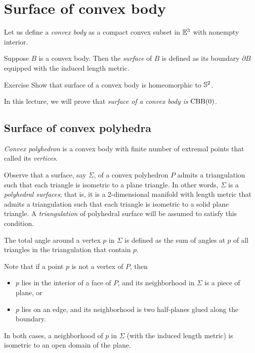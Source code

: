 \chapter{Surface of convex body}\label{chap:convex-body}

Let us define a \emph{convex body} as a compact convex subset in $\mathbb{E}^3$ with nonempty interior.

Suppose $B$ is a convex body.
Then the \emph{surface} of $B$ is defined as its boundary $\partial B$ equipped with the induced length metric.

\begin{thm}{Exercise}\label{ex:surf-S2}
Show that surface of a convex body is homeomorphic to $\mathbb{S}^2$.
\end{thm}

In this lecture, we will prove that \textit{surface of a convex body is $\mathrm{CBB}(0)$.}


\section{Surface of convex polyhedra}

\emph{Convex polyhedron} is a convex body with finite number of extremal points that called its \emph{vertices}.

Observe that a surface, say $\Sigma$, of a convex polyhedron $P$ admits a triangulation such that each triangle is isometric to a plane triangle.
In other words, $\Sigma$ is a \emph{polyhedral surfaces};
that is, it is a 2-dimensional manifold with length metric that admits a triangulation such that each triangle is isometric to a solid plane triangle.
A \emph{triangulation} of polyhedral surface will be assumed to satisfy this condition.

The total angle around a vertex $p$ in $\Sigma$ is defined as the sum of angles at $p$ of all triangles in the triangulation that contain $p$.

Note that if a point $p$ is not a vertex of $P$,
then
\begin{itemize}
\item $p$ lies in the interior of a face of $P$, and its neighborhood in $\Sigma$ is a piece of plane, or
\item $p$ lies on an edge, and its neighborhood is two half-planes glued along the boundary.
\end{itemize}
In both cases, a neighborhood of $p$ in $\Sigma$ (with the induced length metric) is isometric to an open domain of the plane.

